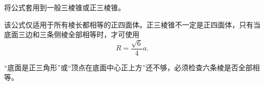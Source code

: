 \begin{trapbox}
	\medskip
	\begin{description}[style=nextline, leftmargin=2.8em, labelsep=0.5em, itemsep=0.35em]
		\item[\textbf{\textcolor{CTrap}{易错点五（适用范围）}}] 将公式套用到一般三棱锥或正三棱锥。
		\item[\textbf{\textcolor{CTrap}{正确理解（只限正四面体）：}}] 该公式仅适用于所有棱长都相等的正四面体。正三棱锥不一定是正四面体，只有当底面三边和三条侧棱全部相等时，才可使用
		      \[
			      R=\frac{\sqrt{6}}{4}a.
		      \]
		\item[\textbf{\textcolor{CTrap}{错因分析（条件忽略）：}}] “底面是正三角形”或“顶点在底面中心正上方”还不够，必须检查六条棱是否全部相等。
	\end{description}
\end{trapbox}